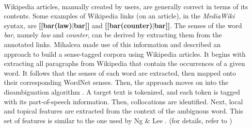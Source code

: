 \documentclass[12 pt]{article}
\begin{document}
\paragraph{}
Wikipedia articles, manually created by users, are generally correct in terms of its contents. Some examples of Wikipedia links (on an article), in the \textit{MediaWiki} syntax, are \textbf{[[bar(law)$|$bar]]} and \textbf{[[bar(counter)$|$bar]]}. The senses of the word \textit{bar}, namely \textit{law} and \textit{counter}, can be derived by extracting them from the annotated links. Mihalcea \cite{wikipedia} made use of this information and described an approach to build a sense-tagged corpora using Wikipedia articles. It begins with extracting all paragraphs from Wikipedia that contain the occurrences of a given word. It follows that the senses of each word are extracted, then mapped onto their corresponding WordNet senses. Then, the approach moves on into the disambiguation algorithm \cite{wikipedia}. A target text is tokenized, and each token is tagged with its part-of-speech information. Then, collocations are identified. Next, local and topical features are extracted from the context of the ambiguous word. This set of features is similar to the one used by Ng \& Lee \cite{exemplar}. (for details, refer to \cite{wikipedia})
%
\end{document}
